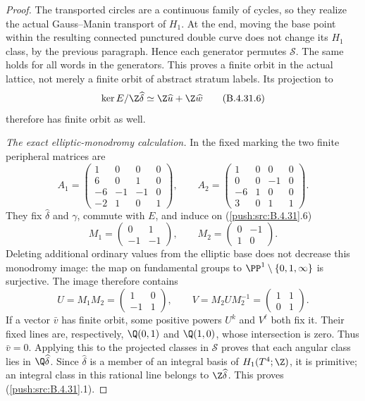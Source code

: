 \begin{proof}
The transported circles are a continuous family of cycles,
so they realize the actual Gauss--Manin transport of $H_1$.
At the end, moving the base point within the resulting
connected punctured double curve does not change its $H_1$
class, by the previous paragraph. Hence each generator
permutes $\mathscr S$. The same holds for all words in the
generators. This proves a finite orbit in the actual lattice,
not merely a finite orbit of abstract stratum labels.
Its projection to
\[
 \ker E/\Z\widehat\delta
       \simeq \Z\widehat u+\Z\widehat w
 \tag{B.4.31.6}
\]
therefore has finite orbit as well.

\emph{The exact elliptic-monodromy calculation.}
In the fixed marking the two finite peripheral
matrices are
\[
 A_1=\begin{pmatrix}
 1&0&0&0\\6&0&1&0\\-6&-1&-1&0\\-2&1&0&1
 \end{pmatrix},\qquad
 A_2=\begin{pmatrix}
 1&0&0&0\\0&0&-1&0\\-6&1&0&0\\3&0&1&1
 \end{pmatrix}.
 \tag{B.4.31.7}
\]
They fix $\widehat\delta$ and $\gamma$, commute with $E$,
and induce on (\ref{push:src:B.4.31}.6)
\[
 M_1=\begin{pmatrix}0&1\\-1&-1\end{pmatrix},\qquad
 M_2=\begin{pmatrix}0&-1\\1&0\end{pmatrix}.
\]
Deleting additional ordinary values from the elliptic base
does not decrease this monodromy image: the map on fundamental
groups to $\PP^1\setminus\{0,1,\infty\}$ is surjective.
The image therefore contains
\[
 U=M_1M_2=\begin{pmatrix}1&0\\-1&1\end{pmatrix},\qquad
 V=M_2UM_2^{-1}=\begin{pmatrix}1&1\\0&1\end{pmatrix}.
 \tag{B.4.31.8}
\]
If a vector $\bar v$ has finite orbit, some positive powers
$U^k$ and $V^\ell$ both fix it. Their fixed lines are,
respectively, $\Q(0,1)$ and $\Q(1,0)$, whose intersection
is zero. Thus $\bar v=0$. Applying this to the projected
classes in $\mathscr S$ proves that each angular class lies
in $\Q\widehat\delta$. Since $\widehat\delta$ is a member
of an integral basis of $H_1(T^4;\Z)$, it is primitive;
an integral class in this rational line belongs to
$\Z\widehat\delta$. This proves (\ref{push:src:B.4.31}.1).


\end{proof}
